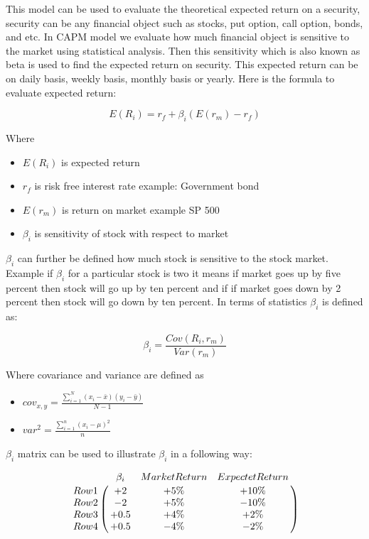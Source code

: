 This model can be used to evaluate the theoretical expected return on a security, security can be any financial object such as stocks, put option, call option, bonds, and etc. 
In CAPM model we evaluate how much financial object is sensitive to the market using statistical analysis. Then this sensitivity which is also known as beta is used
to find the expected return on security. This expected return can be on daily basis, weekly basis, monthly basis or yearly. Here is the formula to evaluate expected return:


$$E(R_{i}) = r_{f} + \beta_{i}(E(r_{m}) - r_{f})$$

\indent
Where
\indent 

 
\begin{itemize} 
\item $E(R_{i})$ is expected return 
\item $r_{f}$ is risk free interest rate example: Government bond
\item $E(r_{m})$ is return on market example SP 500
\item $\beta_{i}$ is sensitivity of stock with respect to market  
\end{itemize}


$\beta_{i}$ can further be defined how much stock is sensitive to the stock market. Example if $\beta_{i}$  for a particular stock is two it means if market goes up by five percent then stock will go up by ten percent and if if market goes down by 2 percent then stock will go down by ten percent. In terms of statistics $\beta_{i}$  is defined as:

$$\beta_{i}  = \frac{Cov(R_{i},r_{m})}{Var(r_{m})}$$

\indent
Where covariance and variance are defined as
\indent

\begin{itemize} 
\item $cov_{x,y}=\frac{\sum_{i=1}^{N}(x_{i}-\bar{x})(y_{i}-\bar{y})}{N-1}$

\item $var^2 = \frac{\displaystyle\sum_{i=1}^{n}(x_i - \mu)^2} {n}$
\end{itemize}

\indent 
$\beta_{i}$ matrix can be used to illustrate $\beta_{i}$ in a following way:

$$\bordermatrix{\text{}&\beta_{i} &Market Return  &Expectet Return\cr
                Row 1& +2   &  +5 \%  &  +10 \%\cr
                Row 2& -2   &  +5 \%  &  -10 \%\cr
                Row 3& +0.5 &  +4 \%  &  +2  \%\cr
                Row 4& +0.5 &  -4 \%  &  -2  \%}$$

